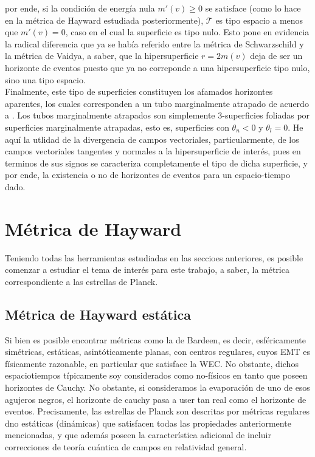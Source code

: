 \documentclass[16pt,a4paper]{article}
\numberwithin{equation}{section}
\theoremstyle{definition}
\begin{document}
por ende, si la condición de energía nula $m'(v) \geq 0$ se satisface (como lo hace en la métrica de Hayward estudiada posteriormente), $\mathcal{T}$ es tipo espacio a menos que $m'(v) = 0$, caso en el cual la superficie es tipo nulo. Esto pone en evidencia la radical diferencia que ya se había referido entre la métrica de Schwarzschild y la métrica de Vaidya, a saber, que la hipersuperficie $r = 2m(v)$ deja de ser un horizonte de eventos puesto que ya no correponde a una hipersuperficie tipo nulo, sino una tipo espacio.\\

Finalmente, este tipo de superficies constituyen los afamados horizontes aparentes, los cuales corresponden a un tubo marginalmente atrapado de acuerdo a \cite{blau}. Los tubos marginalmente atrapados son simplemente 3-superficies foliadas por superficies marginalmente atrapadas, esto es, superficies con $\theta_n <0$ y $\theta_l = 0$. He aquí la utlidad de la divergencia de campos vectoriales, particularmente, de los campos vectoriales tangentes y normales a la hipersuperficie de interés, pues en terminos de sus signos se caracteriza completamente el tipo de dicha superficie, y por ende, la existencia o no de horizontes de eventos para un espacio-tiempo dado.	

\newpage
\section{\label{planck stars section} Métrica de Hayward}

Teniendo todas las herramientas estudiadas en las seccioes anteriores, es posible comenzar a estudiar el tema de interés para este trabajo, a saber, la métrica correspondiente a las estrellas de Planck.

\subsection{Métrica de Hayward estática}

Si bien es posible encontrar métricas como la de Bardeen, es decir, esféricamente simétricas, estáticas, asintóticamente planas, con centros regulares, cuyos EMT es físicamente razonable, en particular que satisface la WEC. No obstante, dichos espaciotiempos típicamente soy considerados como no-físicos en tanto que poseen horizontes de Cauchy. No obstante, si consideramos la evaporación de uno de esos agujeros negros, el horizonte de cauchy pasa a user tan real como el horizonte de eventos.  Precisamente, las estrellas de Planck son descritas por métricas regulares dno estáticas (dinámicas) que satisfacen todas las propiedades anteriormente mencionadas, y que además poseen la característica adicional de incluir correcciones de teoría cuántica de campos en relatividad general.\\
\end{document}
